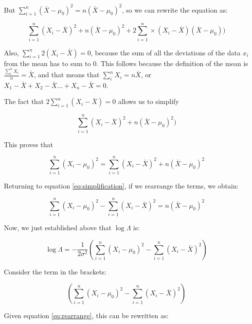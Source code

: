 \documentclass[
  12pt,
]{krantz}
\theoremstyle{definition}
\theoremstyle{definition}
\theoremstyle{definition}
\theoremstyle{definition}
\theoremstyle{remark}
\begin{document}
\begin{blackbox}
But \(\sum_{i=1}^n (\bar{X} -\mu_0)^2=n (\bar{X} -\mu_0)^2\), so we can rewrite the equation as:

\begin{equation}
\sum_{i=1}^n (X_i - \bar{X})^2 +n(\bar{X} -\mu_0)^2 + 
2\sum_{i=1}^n \times (X_i - \bar{X})(\bar{X} -\mu_0) )
\end{equation}

Also, \(\sum_{i=1}^n 2 (X_i - \bar{X}) = 0\), because the sum of all the deviations of the data \(x_i\) from the mean has to sum to 0. This follows because the definition of the mean is \(\frac{\sum_i^n X_i}{n} = \bar{X}\), and that means that \(\sum_i^n X_i = n\bar{X}\), or \(X_1-\bar{X} + X_2 - \bar{X} \dots + X_n -\bar{X}=0\).

The fact that \(2 \sum_{i=1}^n (X_i - \bar{X}) = 0\) allows us to simplify

\begin{equation}
\sum_{i=1}^n (X_i - \bar{X})^2 +n(\bar{X} -\mu_0)^2)
\end{equation}

This proves that

\begin{equation}
\sum_{i=1}^n (X_i -\mu_0)^2 = \sum_{i=1}^n (X_i - \bar{X})^2 + n(\bar{X} - \mu_0)^2 
\end{equation}

\end{blackbox}

Returning to equation \eqref{eq:simplification}, if we rearrange the terms, we obtain:

\begin{equation}
\sum_{i=1}^n (X_i -\mu_0)^2 - \sum_{i=1}^n (X_i - \bar{X})^2 = n(\bar{X} - \mu_0)^2 
\label{eq:rearrange}
\end{equation}

Now, we just established above that \(\log \Lambda\) is:

\begin{equation}
\log \Lambda= -\frac{1}{2\sigma^2} \left( \sum_{i=1}^n (X_i - \mu_0)^2  -  \sum_{i=1}^n (X_i - \bar{X})^2 \right)
\label{eq:loglambda2}
\end{equation}

Consider the term in the brackets:

\begin{equation}
\left(\sum_{i=1}^n (X_i - \mu_0)^2  -  \sum_{i=1}^n (X_i - \bar{X})^2\right)
\end{equation}

Given equation \eqref{eq:rearrange}, this can be rewritten as:
\end{document}
